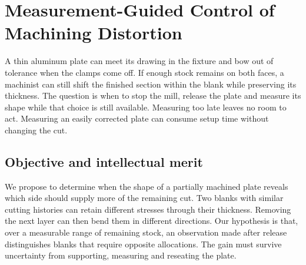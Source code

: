 \documentclass[11pt,letterpaper]{article}
\begin{document}
\section*{Measurement-Guided Control of Machining Distortion}

A thin aluminum plate can meet its drawing in the fixture and bow out of tolerance when the clamps come off. If enough stock remains on both faces, a machinist can still shift the finished section within the blank while preserving its thickness. The question is when to stop the mill, release the plate and measure its shape while that choice is still available. Measuring too late leaves no room to act. Measuring an easily corrected plate can consume setup time without changing the cut.

\subsection*{Objective and intellectual merit}

We propose to determine when the shape of a partially machined plate reveals which side should supply more of the remaining cut. Two blanks with similar cutting histories can retain different stresses through their thickness. Removing the next layer can then bend them in different directions. Our hypothesis is that, over a measurable range of remaining stock, an observation made after release distinguishes blanks that require opposite allocations. The gain must survive uncertainty from supporting, measuring and reseating the plate.

\begin{center}


\end{center}
\end{document}
